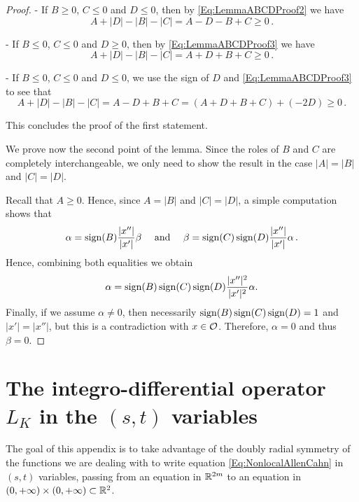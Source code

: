 \begin{proof}
- If $B \geq 0$, $C \leq 0$ and $D \leq 0$, then by \eqref{Eq:LemmaABCDProof2} we have
$$
A + |D| - |B| - |C| = A - D - B + C \geq 0\,.
$$

- If $B \leq 0$, $C \leq 0$ and $D \geq 0$, then by \eqref{Eq:LemmaABCDProof3} we have
$$
A + |D| - |B| - |C| = A + D + B + C \geq 0\,.
$$

- If $B \leq 0$, $C \leq 0$ and $D \leq 0$, we use the sign of $D$ and \eqref{Eq:LemmaABCDProof3} to see that
$$
A + |D| - |B| - |C| = A - D + B + C =  (A + D + B + C) + (-2D) \geq 0\,.
$$

This concludes the proof of the first statement.

We prove now the second point of the lemma. Since the roles of $B$ and $C$ are completely
interchangeable, we only need to show the result in the case $|A| = |B|$ and $|C| = |D|$.

Recall that $A \geq 0$. Hence, since $A = |B|$ and $|C| = |D|$, a simple computation shows that
$$
\alpha = \operatorname{sign} (B) \dfrac{|x''|}{|x'|}\beta \quad \textrm{ and } \quad
\beta = \operatorname{sign} (C) \operatorname{sign}(D) \dfrac{|x''|}{|x'|} \alpha \,.
$$
Hence, combining both equalities we obtain
$$
\alpha = \operatorname{sign} (B) \operatorname{sign} (C) \operatorname{sign}(D) \dfrac{|x''|^2}{|x'|^2} \alpha.
$$
Finally, if we assume $\alpha \neq 0$, then necessarily $\operatorname{sign} (B) \operatorname{sign} (C) \operatorname{sign}(D)=1$ and $|x'|
= |x''|$, but this is a contradiction with $x\in \mathcal{O}$. Therefore, $\alpha = 0$ and thus $\beta =
0$.
\end{proof}








\section{The integro-differential operator $L_K$ in the $(s,t)$ variables}
\label{Sec:stcomputations}

The goal of this appendix is to take advantage of the doubly radial symmetry of the functions we
are dealing with to write equation \eqref{Eq:NonlocalAllenCahn} in $(s,t)$ variables, passing from
an equation in $\mathbb{R}^{2m}$ to an equation in $(0,+\infty)\times (0,+\infty)\subset \mathbb{R}^2$.

